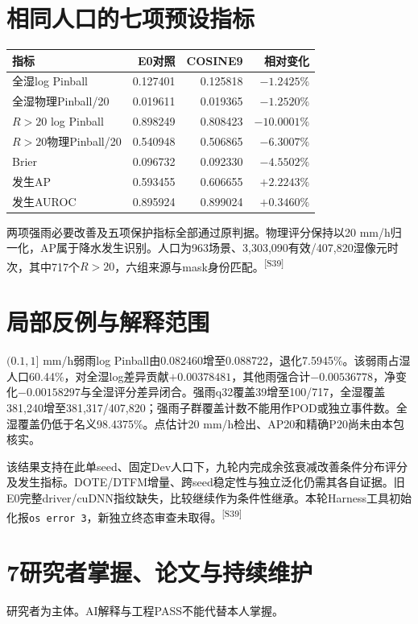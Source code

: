 \documentclass[UTF8,10.5pt,a4paper,fontset=none]{ctexart}
\newcommand{\evi}[1]{\textsuperscript{\color{muted}[#1]}}
\newcommand{\pageheading}[2]{\clearpage\section*{#1}\textcolor{muted}{#2}\par\vspace{3pt}}
\begin{document}
\section*{相同人口的七项预设指标}
\begin{tabularx}{\textwidth}{@{}Xrrr@{}}
\toprule 指标 & E0对照 & COSINE9 & 相对变化\\\midrule
全湿log Pinball & 0.127401 & 0.125818 & $-1.2425\%$\\
全湿物理Pinball/20 & 0.019611 & 0.019365 & $-1.2520\%$\\
$R>20$ log Pinball & 0.898249 & 0.808423 & $-10.0001\%$\\
$R>20$物理Pinball/20 & 0.540948 & 0.506865 & $-6.3007\%$\\
Brier & 0.096732 & 0.092330 & $-4.5502\%$\\
发生AP & 0.593455 & 0.606655 & $+2.2243\%$\\
发生AUROC & 0.895924 & 0.899024 & $+0.3460\%$\\
\bottomrule
\end{tabularx}

两项强雨必要改善及五项保护指标全部通过原判据。物理评分保持以20 mm/h归一化，AP属于降水发生识别。人口为963场景、3,303,090有效/407,820湿像元时次，其中717个$R>20$，六组来源与mask身份匹配。\evi{S39}

\section*{局部反例与解释范围}
$(0.1,1]$ mm/h弱雨log Pinball由0.082460增至0.088722，退化7.5945\%。该弱雨占湿人口60.44\%，对全湿log差异贡献$+0.00378481$，其他雨强合计$-0.00536778$，净变化$-0.00158297$与全湿评分差异闭合。强雨q32覆盖39增至100/717，全湿覆盖381,240增至381,317/407,820；强雨子群覆盖计数不能用作POD或独立事件数。全湿覆盖仍低于名义98.4375\%。点估计20 mm/h检出、AP20和精确P20尚未由本包核实。

该结果支持在此单seed、固定Dev人口下，九轮内完成余弦衰减改善条件分布评分及发生指标。DOTE/DTFM增量、跨seed稳定性与独立泛化仍需其各自证据。旧E0完整driver/cuDNN指纹缺失，比较继续作为条件性继承。本轮Harness工具初始化报\texttt{os error 3}，新独立终态审查未取得。\evi{S39}

\pageheading{7\quad 研究者掌握、论文与持续维护}{研究者为主体。AI解释与工程PASS不能代替本人掌握。}
\end{document}
